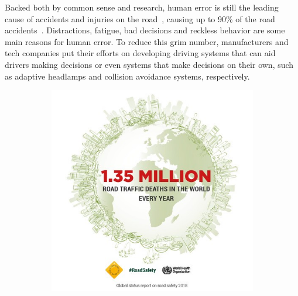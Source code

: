 Backed both by common sense and research, human error is still the leading cause of accidents and injuries on the road~\cite{Bimbraw2015, WHO2018}, causing up to 90\% of the road accidents~\cite{WHO2018}. Distractions, fatigue, bad decisions and reckless behavior are some main reasons for human error. To reduce this grim number, manufacturers and tech companies put their efforts on developing driving systems that can aid drivers making decisions or even systems that make decisions on their own, such as adaptive headlamps and collision avoidance systems, respectively.


\begin{figure}[H]
	\centering
	\begin{subfigure}[c]{0.3\textwidth}
		\includegraphics[width=\textwidth]{img/road_safety/1_35-million.jpg}
		\label{fig:test_image_1}
	\end{subfigure}
	\quad
	\begin{subfigure}[c]{0.3\textwidth}

\end{subfigure}
\end{figure}
